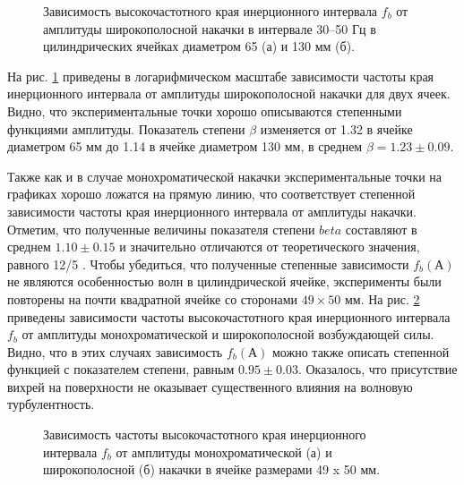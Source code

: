 \begin{figure}[ht]
  \begin{minipage}[ht]{0.49\linewidth}
  \end{minipage}
  \hfill
  \begin{minipage}[ht]{0.49\linewidth}
  \end{minipage}
  \caption{Зависимость высокочастотного края инерционного интервала $f_b$ от амплитуды широкополосной накачки в интервале 30–50 Гц в цилиндрических ячейках диаметром 65 (а) и 130 мм (б).}
  \label{img:water_fb_wide}  
\end{figure}

На рис. \ref{img:water_fb_wide} приведены в логарифмическом масштабе зависимости частоты края инерционного интервала от амплитуды широкополосной накачки для двух ячеек. Видно, что экспериментальные точки хорошо описываются степенными функциями амплитуды. Показатель степени $\beta$ изменяется от 1.32 в ячейке диаметром 65 мм до 1.14 в ячейке диаметром 130 мм, в среднем $\beta = 1.23 \pm 0.09$.

Также как и в случае монохроматической накачки экспериментальные точки на графиках хорошо ложатся на прямую линию, что соответствует степенной зависимости частоты края инерционного интервала от амплитуды накачки. Отметим, что полученные величины показателя степени $beta$ составляют в среднем $1.10 \pm 0.15$ и значительно отличаются от теоретического значения, равного 12/5 \cite{Ryzhenkova}.
Чтобы убедиться, что полученные степенные зависимости $f_b(А)$ не являются особенностью волн в цилиндрической 
ячейке, эксперименты были повторены на почти квадратной ячейке со сторонами $49 \times 50$ мм. На рис. \ref{img:water_fb_rect} приведены зависимости частоты высокочастотного края инерционного интервала $f_b$ от амплитуды монохроматической и широкополосной возбуждающей силы. Видно, что в этих случаях зависимость $f_b(А)$ можно также описать степенной функцией с показателем степени, равным $0.95 \pm 0.03$. Оказалось, что присутствие вихрей на поверхности не оказывает существенного влияния на волновую турбулентность.
\begin{figure}[ht]
  \begin{minipage}[ht]{0.49\linewidth}
  \end{minipage}
  \hfill
  \begin{minipage}[ht]{0.49\linewidth}
  \end{minipage}
  \caption{Зависимость частоты высокочастотного края инерционного интервала $f_b$ от амплитуды монохроматической (а) и широкополосной (б) накачки в ячейке размерами 49 x 50 мм.}
  \label{img:water_fb_rect}  
\end{figure}

